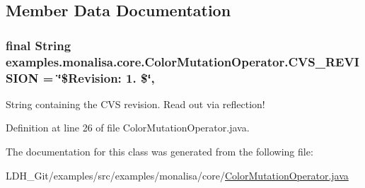 \subsection{Member Data Documentation}
\hypertarget{classexamples_1_1monalisa_1_1core_1_1_color_mutation_operator_a2f8c7e3d6be4315ac2bfb40af4c5af46}{
\subsubsection[{C\-V\-S\-\_\-\-R\-E\-V\-I\-S\-I\-O\-N}]{\setlength{\rightskip}{0pt plus 5cm}final String examples.\-monalisa.\-core.\-Color\-Mutation\-Operator.\-C\-V\-S\-\_\-\-R\-E\-V\-I\-S\-I\-O\-N = \char`\"{}\$Revision\-: 1. \$\char`\"{}\hspace{0.3cm}{\ttfamily [static]}, {\ttfamily [private]}}}\label{classexamples_1_1monalisa_1_1core_1_1_color_mutation_operator_a2f8c7e3d6be4315ac2bfb40af4c5af46}
String containing the C\-V\-S revision. Read out via reflection! 

Definition at line 26 of file Color\-Mutation\-Operator.\-java.



The documentation for this class was generated from the following file\-:\begin{DoxyCompactItemize}
\item 
L\-D\-H\-\_\-\-Git/examples/src/examples/monalisa/core/\hyperlink{_color_mutation_operator_8java}{Color\-Mutation\-Operator.\-java}\end{DoxyCompactItemize}
